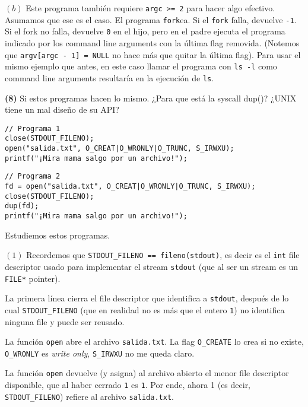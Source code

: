 \documentclass[12pt]{article}
\theoremstyle{definition}
\begin{document}
$(b)$ Este programa también requiere \texttt{argc >= 2} para hacer algo
efectivo. Asumamos que ese es el caso. El programa \texttt{fork}ea. Si el
\texttt{fork} falla, devuelve \texttt{-1}. Si el fork no falla, devuelve
\texttt{0} en el hijo, pero en el padre ejecuta el programa indicado por
los command line arguments con la última flag removida. (Notemos que
\texttt{argv[argc - 1] = NULL} no hace más que quitar la última flag). Para usar
el mismo ejemplo que antes, en este caso llamar el programa con \texttt{ls -l}
como command line arguments resultaría en la ejecución de \texttt{ls}.

\pagebreak 

\begin{shaded}
    \textbf{(8)} Si estos programas hacen lo mismo. ¿Para que está la syscall dup()? ¿UNIX tiene un
mal diseño de su API?

\begin{verbatim}
// Programa 1
close(STDOUT_FILENO);
open("salida.txt", O_CREAT|O_WRONLY|O_TRUNC, S_IRWXU);
printf("¡Mira mama salgo por un archivo!");
\end{verbatim}

\begin{verbatim}
// Programa 2
fd = open("salida.txt", O_CREAT|O_WRONLY|O_TRUNC, S_IRWXU);
close(STDOUT_FILENO);
dup(fd);
printf("¡Mira mama salgo por un archivo!");
\end{verbatim}

\end{shaded}

Estudiemos estos programas.

$(1)$ Recordemos que \texttt{STDOUT\_FILENO == fileno(stdout)}, es decir es el
\texttt{int} file descriptor usado para implementar el stream \texttt{stdout}
(que al ser un stream es un \texttt{FILE*} pointer). 

La primera línea cierra el file descriptor que identifica a \texttt{stdout},
después de lo cual \texttt{STDOUT\_FILENO} (que en realidad no es más que el
entero \texttt{1}) no identifica ninguna file y puede ser reusado. 

La función \texttt{open} abre el archivo \texttt{salida.txt}. La flag
\texttt{O\_CREATE} lo crea si no existe, \texttt{O\_WRONLY} es \textit{write
only}, \texttt{S\_IRWXU} no me queda claro.

La función \texttt{open} devuelve (y asigna) al archivo abierto el menor file
descriptor disponible, que al haber cerrado \texttt{1} es \texttt{1}. Por ende,
ahora 1 (es decir, \texttt{STDOUT\_FILENO}) refiere al archivo
\texttt{salida.txt}. 
\end{document}
